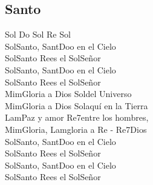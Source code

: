 \subsection{Santo}

\begin{center}

{\Large
\hspace{-7em}\ac{Sol Do Sol Re Sol}\\
\ac{Sol}Santo, Sant\ac{Do}o en el Cielo\\
\ac{Sol}Santo \ac{Re}es el \ac{Sol}Señor\\
\vspace{1em}
\ac{Sol}Santo, Sant\ac{Do}o en el Cielo\\
\ac{Sol}Santo \ac{Re}es el \ac{Sol}Señor\\
\vspace{1em}
\ac{Mim}Gloria a Dios \ac{Sol}del Universo\\
\ac{Mim}Gloria a Dios \ac{Sol}aquí en la Tierra\\
\ac{Lam}Paz y amor \ac{Re7}entre los hombres,\\
\ac{Mim}Gloria, \ac{Lam}gloria a \ac{Re - Re7}Dios\\
\vspace{1em}
\ac{Sol}Santo, Sant\ac{Do}o en el Cielo\\
\ac{Sol}Santo \ac{Re}es el \ac{Sol}Señor\\
\vspace{1em}
\ac{Sol}Santo, Sant\ac{Do}o en el Cielo\\
\ac{Sol}Santo \ac{Re}es el \ac{Sol}Señor\\
}
\end{center}

